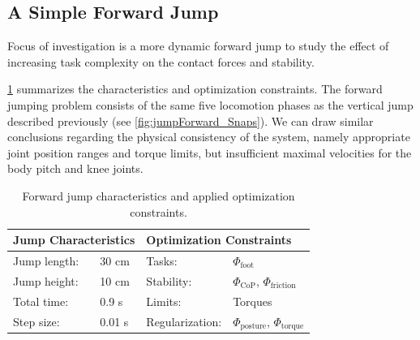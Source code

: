 \subsection{A Simple Forward Jump}
Focus of investigation is a more dynamic forward jump to study the effect of increasing task complexity on the contact forces and stability.

\cref{tab:jumpForward} summarizes the characteristics and optimization constraints. The forward jumping problem consists of the same five locomotion phases as the vertical jump described previously (see \cref{fig:jumpForward_Snaps}). 
We can draw similar conclusions regarding the physical consistency of the system, namely appropriate joint position ranges and torque limits, but insufficient maximal velocities for the body pitch and knee joints. 

\begin{table}[t]
\centering
\caption[Forward jump characteristics and optimization constraints]{Forward jump characteristics and applied optimization constraints.}
\begin{tabular}{|ll|ll|}
\hline
\multicolumn{2}{|l|}{\textbf{Jump Characteristics}} & \multicolumn{2}{l|}{\textbf{Optimization Constraints}} \\ \hline
Jump length:& 30 cm 	& Tasks: 			& $\Phi_{\text{foot}}$ \\ \hline
Jump height:& 10 cm	& Stability:    		& $\Phi_{\text{CoP}}$, $\Phi_{\text{friction}}$\\ \hline
Total time:& 0.9 s 	& Limits: 			& Torques\\ \hline
Step size:& 0.01 s 	& Regularization: 	& $\Phi_{\text{posture}}$, $\Phi_{\text{torque}}$\\ \hline
\end{tabular}
\label{tab:jumpForward}
\end{table}

